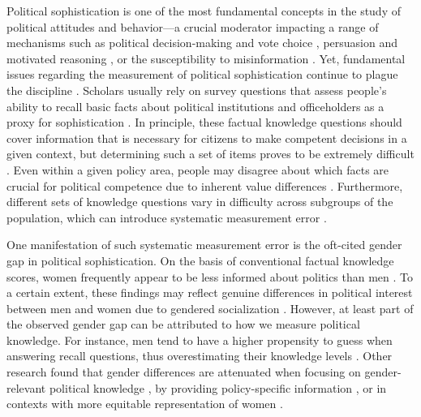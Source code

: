 

Political sophistication is one of the most fundamental concepts in the study of political attitudes and behavior---a crucial moderator impacting a range of mechanisms such as political decision-making and vote choice \citep{macdonald1995political,lau2001advantages}, persuasion and motivated reasoning \citep{zaller1992nature,lodge2013rationalizing}, or the susceptibility to misinformation \citep{vegetti2020impact}. Yet, fundamental issues regarding the measurement of political sophistication continue to plague the discipline \citep{mondak2001developing,sturgis2008experiment,bullock2021response}. Scholars usually rely on survey questions that assess people's ability to recall basic facts about political institutions and officeholders as a proxy for sophistication \citep{carpini1993measuring,barabas2014question}. In principle, these factual knowledge questions should cover information that is necessary for citizens to make competent decisions in a given context, but determining such a set of items proves to be extremely difficult \citep{lupia2006elitism}. Even within a given policy area, people may disagree about which facts are crucial for political competence due to inherent value differences \citep{lupia2015uninformed}. Furthermore, different sets of knowledge questions vary in difficulty across subgroups of the population, which can introduce systematic measurement error \citep{pietryka2013analysis}.

One manifestation of such systematic measurement error is the oft-cited gender gap in political sophistication. On the basis of conventional factual knowledge scores, women frequently appear to be less informed about politics than men \citep{verba1997knowing,wolak2011roots,fraile2014women}. To a certain extent, these findings may reflect genuine differences in political interest between men and women due to gendered socialization \citep{bos2021one}. However, at least part of the observed gender gap can be attributed to how we measure political knowledge. For instance, men tend to have a higher propensity to guess when answering recall questions, thus overestimating their knowledge levels \citep{mondak2004knowledge,fortin2020political}. Other research found that gender differences are attenuated when focusing on gender-relevant political knowledge \citep{dolan2011women}, by providing policy-specific information \citep{jerit2017revisiting}, or in contexts with more equitable representation of women \citep{pereira2019gendered}.


